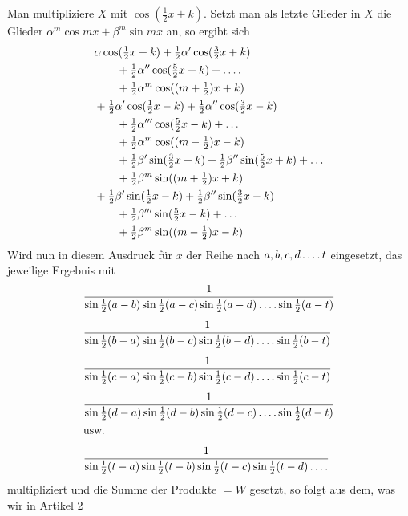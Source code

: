 Man multipliziere $X$ mit $\cos(\tfrac12x+k)$. Setzt man als letzte Glieder in $X$ die Glieder $\alpha^m\cos mx+\beta^m\sin mx$ an, so ergibt sich
\[
\begin{aligned}
&\alpha\cos(\tfrac12x+k)+\tfrac12\alpha'\cos(\tfrac32x+k)\\&\qquad+\tfrac12\alpha''\cos(\tfrac52x+k)+\mathinner{.\,.\,.\,.}\\
&\hspace{2.01em}+\tfrac12\alpha^m\cos((m+\tfrac12)x+k)\\
&+\tfrac12\alpha'\cos(\tfrac12x-k)+\tfrac12\alpha''\cos(\tfrac32x-k)\\&\qquad+\tfrac12\alpha'''\cos(\tfrac52x-k)+\mathinner{.\,.\,.}\\
&\hspace{2.01em}+\tfrac12\alpha^m\cos((m-\tfrac12)x-k)\\
&\hspace{2em}+\tfrac12\beta'\sin(\tfrac32x+k)+\tfrac12\beta''\sin(\tfrac52x+k)+\mathinner{.\,.\,.}\\
&\hspace{2.01em}+\tfrac12\beta^m\sin((m+\tfrac12)x+k)\\
&+\tfrac12\beta'\sin(\tfrac12x-k)+\tfrac12\beta''\sin(\tfrac32x-k)\\&\qquad+\tfrac12\beta'''\sin(\tfrac52x-k)+\mathinner{.\,.\,.}\\
&\hspace{2.01em}+\tfrac12\beta^m\sin((m-\tfrac12)x-k)
\end{aligned}
\]
Wird nun in diesem Ausdruck für $x$ der Reihe nach $a,b,c,d\mathinner{.\,.\,.\,.}t$ eingesetzt, das
jeweilige Ergebnis mit
\[
\begin{aligned}
&\frac{1}{\sin\tfrac12(a-b)\sin\tfrac12(a-c)\sin\tfrac12(a-d)\mathinner{.\,.\,.\,.}\sin\tfrac12(a-t)}\\[1ex]
&\frac{1}{\sin\tfrac12(b-a)\sin\tfrac12(b-c)\sin\tfrac12(b-d)\mathinner{.\,.\,.\,.}\sin\tfrac12(b-t)}\\[1ex]
&\frac{1}{\sin\tfrac12(c-a)\sin\tfrac12(c-b)\sin\tfrac12(c-d)\mathinner{.\,.\,.\,.}\sin\tfrac12(c-t)}\\[1ex]
&\frac{1}{\sin\tfrac12(d-a)\sin\tfrac12(d-b)\sin\tfrac12(d-c)\mathinner{.\,.\,.\,.}\sin\tfrac12(d-t)}\\
&\text{usw.}\\[1ex]
&\frac{1}{\sin\tfrac12(t-a)\sin\tfrac12(t-b)\sin\tfrac12(t-c)\sin\tfrac12(t-d)\mathinner{.\,.\,.\,.}}
\end{aligned}
\]
multipliziert und die Summe der Produkte $=W$ gesetzt, so folgt aus dem, was wir in Artikel 2

